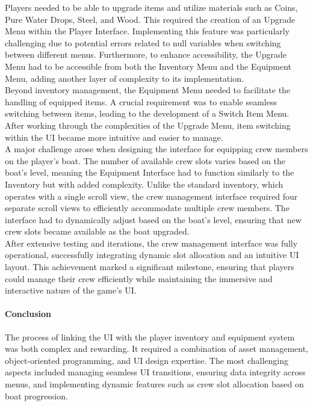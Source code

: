 \documentclass{article}
\begin{document}
Players needed to be able to upgrade items and utilize materials such as Coins, Pure Water Drops, Steel, and Wood. This required the creation of an Upgrade Menu within the Player Interface. Implementing this feature was particularly challenging due to potential errors related to null variables when switching between different menus. Furthermore, to enhance accessibility, the Upgrade Menu had to be accessible from both the Inventory Menu and the Equipment Menu, adding another layer of complexity to its implementation.\\

Beyond inventory management, the Equipment Menu needed to facilitate the handling of equipped items. A crucial requirement was to enable seamless switching between items, leading to the development of a Switch Item Menu. After working through the complexities of the Upgrade Menu, item switching within the UI became more intuitive and easier to manage.\\

A major challenge arose when designing the interface for equipping crew members on the player's boat. The number of available crew slots varies based on the boat's level, meaning the Equipment Interface had to function similarly to the Inventory but with added complexity. Unlike the standard inventory, which operates with a single scroll view, the crew management interface required four separate scroll views to efficiently accommodate multiple crew members. The interface had to dynamically adjust based on the boat's level, ensuring that new crew slots became available as the boat upgraded.\\

After extensive testing and iterations, the crew management interface was fully operational, successfully integrating dynamic slot allocation and an intuitive UI layout. This achievement marked a significant milestone, ensuring that players could manage their crew efficiently while maintaining the immersive and interactive nature of the game's UI.

\paragraph{Conclusion}\hfill

The process of linking the UI with the player inventory and equipment system was both complex and rewarding. It required a combination of asset management, object-oriented programming, and UI design expertise. The most challenging aspects included managing seamless UI transitions, ensuring data integrity across menus, and implementing dynamic features such as crew slot allocation based on boat progression.\\
\end{document}

